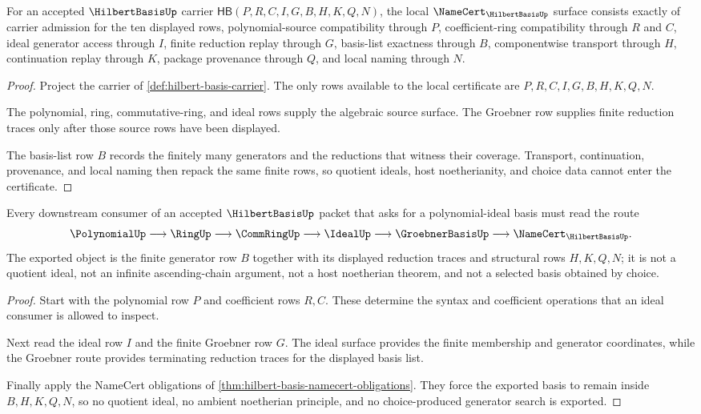 \begin{theorem}\label{thm:hilbert-basis-namecert-obligations}
For an accepted $\HilbertBasisUp$ carrier $\mathsf{HB}(P,R,C,I,G,B,H,K,Q,N)$, the local $\NameCert_{\HilbertBasisUp}$ surface consists exactly of carrier admission for the ten displayed rows, polynomial-source compatibility through $P$, coefficient-ring compatibility through $R$ and $C$, ideal generator access through $I$, finite reduction replay through $G$, basis-list exactness through $B$, componentwise transport through $H$, continuation replay through $K$, package provenance through $Q$, and local naming through $N$.
\end{theorem}
\begin{proof}
Project the carrier of \autoref{def:hilbert-basis-carrier}. The only rows available to the local certificate are $P,R,C,I,G,B,H,K,Q,N$.

The polynomial, ring, commutative-ring, and ideal rows supply the algebraic source surface. The Groebner row supplies finite reduction traces only after those source rows have been displayed.

The basis-list row $B$ records the finitely many generators and the reductions that witness their coverage. Transport, continuation, provenance, and local naming then repack the same finite rows, so quotient ideals, host noetherianity, and choice data cannot enter the certificate.
\end{proof}

\begin{theorem}\label{thm:hilbert-basis-polynomial-ideal-route}
Every downstream consumer of an accepted $\HilbertBasisUp$ packet that asks for a polynomial-ideal basis must read the route
$$
\PolynomialUp \longrightarrow \RingUp \longrightarrow \CommRingUp \longrightarrow \IdealUp \longrightarrow \GroebnerBasisUp \longrightarrow \NameCert_{\HilbertBasisUp}.
$$
The exported object is the finite generator row $B$ together with its displayed reduction traces and structural rows $H,K,Q,N$; it is not a quotient ideal, not an infinite ascending-chain argument, not a host noetherian theorem, and not a selected basis obtained by choice.
\end{theorem}
\begin{proof}
Start with the polynomial row $P$ and coefficient rows $R,C$. These determine the syntax and coefficient operations that an ideal consumer is allowed to inspect.

Next read the ideal row $I$ and the finite Groebner row $G$. The ideal surface provides the finite membership and generator coordinates, while the Groebner route provides terminating reduction traces for the displayed basis list.

Finally apply the NameCert obligations of \autoref{thm:hilbert-basis-namecert-obligations}. They force the exported basis to remain inside $B,H,K,Q,N$, so no quotient ideal, no ambient noetherian principle, and no choice-produced generator search is exported.
\end{proof}

